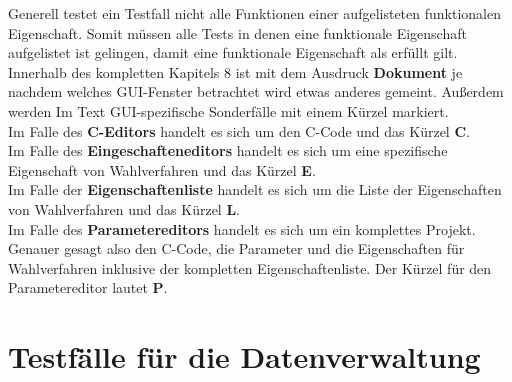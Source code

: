 \documentclass[a4paper]{scrreprt}
\begin{document}
Generell testet ein Testfall nicht alle Funktionen einer aufgelisteten funktionalen Eigenschaft. Somit müssen alle Tests in denen eine funktionale Eigenschaft aufgelistet ist gelingen, damit eine funktionale Eigenschaft als erfüllt gilt. \\
Innerhalb des kompletten Kapitels 8 ist mit dem Ausdruck \textbf{Dokument} je nachdem welches \ac{GUI}-Fenster betrachtet wird etwas anderes gemeint. Außerdem werden Im Text \ac{GUI}-spezifische Sonderfälle mit einem Kürzel markiert. \\
Im Falle des \textbf{C-Editors} handelt es sich um den C-Code und das Kürzel \textbf{C}. \\
Im Falle des \textbf{Eingeschafteneditors} handelt es sich um eine spezifische Eigenschaft von Wahlverfahren und das Kürzel \textbf{E}. \\
Im Falle der \textbf{Eigenschaftenliste} handelt es sich um die Liste der Eigenschaften von Wahlverfahren und das Kürzel \textbf{L}. \\
Im Falle des \textbf{Parametereditors} handelt es sich um ein komplettes Projekt. Genauer gesagt also den C-Code, die Parameter und die Eigenschaften für Wahlverfahren inklusive der kompletten Eigenschaftenliste. Der Kürzel für den Parametereditor lautet \textbf{P}. \\

\section{Testfälle für die Datenverwaltung}
\end{document}
